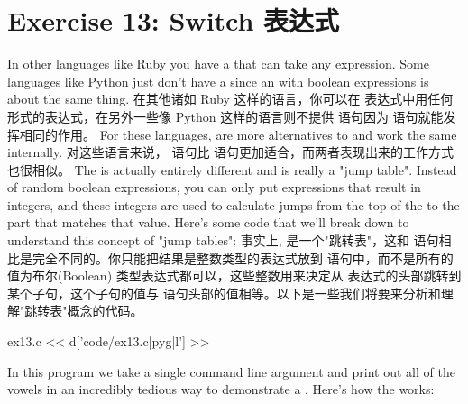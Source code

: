 \chapter{Exercise 13: Switch 表达式}

In other languages like Ruby you have a  that can take
any expression.  Some languages like Python just don't have a
 since an  with boolean expressions
is about the same thing.  
在其他诸如 Ruby 这样的语言，你可以在  表达式中用任何形式的表达式，在另外一些像 Python 这样的语言则不提供  语句因为  语句就能发挥相同的作用。
For these languages,  are
more alternatives to  and work the same internally.
对这些语言来说， 语句比  语句更加适合，而两者表现出来的工作方式也很相似。
The  is actually entirely different and is really a "jump
table".  Instead of random boolean expressions, you can only put expressions
that result in integers, and these integers are used to calculate jumps from
the top of the  to the part that matches that value.  Here's some
code that we'll break down to understand this concept of "jump tables":
事实上, 是一个"跳转表"，这和 语句相比是完全不同的。你只能把结果是整数类型的表达式放到  语句中，而不是所有的值为布尔(Boolean) 类型表达式都可以，这些整数用来决定从  表达式的头部跳转到某个子句，这个子句的值与  语句头部的值相等。以下是一些我们将要来分析和理解"跳转表"概念的代码。

\begin{code}{ex13.c}
<< d['code/ex13.c|pyg|l'] >>
\end{code}

In this program we take a single command line argument and print out all
of the vowels in an incredibly tedious way to demonstrate
a .  Here's how the 
works:


